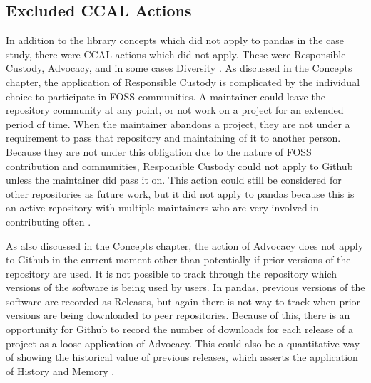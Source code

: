 \subsection{Excluded CCAL Actions}

In addition to the library concepts which did not apply to pandas in the case study, there were CCAL actions which did not apply. These were Responsible Custody, Advocacy, and in some cases Diversity \cite{rubin2016foundationslis}. As discussed in the Concepts chapter, the application of Responsible Custody is complicated by the individual choice to participate in FOSS communities. A maintainer could leave the repository community at any point, or not work on a project for an extended period of time. When the maintainer abandons a project, they are not under a requirement to pass that repository and maintaining of it to another person. Because they are not under this obligation due to the nature of FOSS contribution and communities, Responsible Custody could not apply to Github unless the maintainer did pass it on. This action could still be considered for other repositories as future work, but it did not apply to pandas because this is an active repository with multiple maintainers who are very involved in contributing often \cite{pandasrepo}. 

As also discussed in the Concepts chapter, the action of Advocacy does not apply to Github in the current moment other than potentially if prior versions of the repository are used. It is not possible to track through the repository which versions of the software is being used by users. In pandas, previous versions of the software are recorded as Releases, but again there is not way to track when prior versions are being downloaded to peer repositories. Because of this, there is an opportunity for Github to record the number of downloads for each release of a project as a loose application of Advocacy. This could also be a quantitative way of showing the historical value of previous releases, which asserts the application of History and Memory \cite{rubin2016foundationslis}. 

